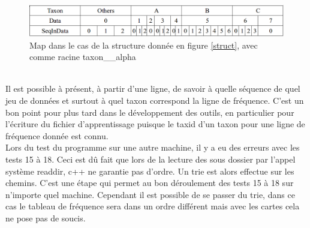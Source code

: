 \begin{figure}[H]
\begin{center}
\includegraphics[scale=0.34]{./../img/map.png}
\caption{\label{map} Map dans le cas de la structure donnée en figure \ref{struct}, avec comme racine taxon\_\_alpha}
\end{center}
\end{figure}
~\\

Il est possible à présent,  à partir d'une ligne, de savoir à quelle séquence de quel jeu de données et surtout à quel taxon correspond la ligne de fréquence. C'est un bon point pour plus tard dans le développement des outils, en particulier pour l'écriture du fichier d’apprentissage puisque le taxid d'un taxon pour une ligne de fréquence donnée est connu. 
\\


Lors du test du programme sur une autre machine, il y a eu des erreurs avec les tests 15 à 18. Ceci est dû fait que lors de la lecture des sous dossier par l'appel système readdir, c++ ne garantie pas d'ordre. Un trie est alors effectue sur les chemins. C'est une étape qui permet au bon déroulement des tests 15 à 18 sur n'importe quel machine. Cependant il est possible de se passer du trie, dans ce cas le tableau de fréquence sera dans un ordre différent mais avec les cartes cela ne pose pas de soucis. 
